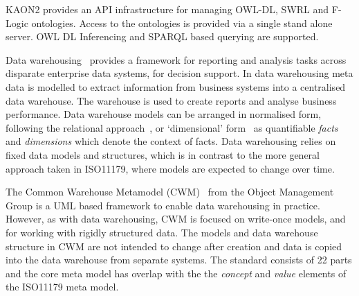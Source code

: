 KAON2\cite{Kaon2} provides an API infrastructure for managing OWL-DL,
SWRL and F-Logic ontologies. Access to the ontologies is provided via
a single stand alone server. OWL DL Inferencing and SPARQL based
querying are supported.




Data warehousing~\cite{kim02} provides a framework for reporting and analysis tasks across disparate enterprise data systems, for decision support. In data warehousing meta data is modelled to extract information from business systems into a centralised data warehouse. The warehouse is used to create reports and analyse business performance. Data warehouse models can be arranged in normalised form, following the relational approach~\cite{inm92}, or `dimensional’ form~\cite{kim02} as quantifiable \emph{facts} and \emph{dimensions} which denote the context of facts. Data warehousing relies on fixed data models and structures, which is in contrast to the more general approach taken in ISO11179, where models are expected to change over time. 

The Common Warehouse Metamodel (CWM)~\cite{poole03} from the Object Management Group is a UML based framework to enable data warehousing in practice. However, as with data warehousing, CWM is focused on write-once models, and for working with rigidly structured data. The models and data warehouse structure in CWM are not intended to change after creation and data is copied into the data warehouse from separate systems. The standard consists of 22 parts and the core meta model has overlap with the the \emph{concept} and \emph{value} elements of the ISO11179 meta model.

